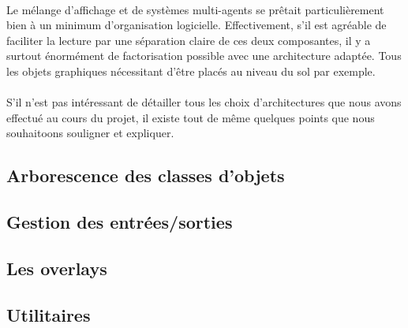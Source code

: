 \paragraph{}
Le mélange d'affichage et de systèmes multi-agents se prêtait particulièrement
bien à un minimum d'organisation logicielle. Effectivement, s'il est agréable
de faciliter la lecture par une séparation claire de ces deux composantes, il
y a surtout énormément de factorisation possible avec une architecture
adaptée. Tous les objets graphiques nécessitant d'être placés au niveau du sol
par exemple.

\paragraph{}
S'il n'est pas intéressant de détailler tous les choix d'architectures que
nous avons effectué au cours du projet, il existe tout de même quelques points
que nous souhaitoons souligner et expliquer.

\subsection{Arborescence des classes d'objets}

\subsection{Gestion des entrées/sorties}

\subsection{Les overlays}

\subsection{Utilitaires}

